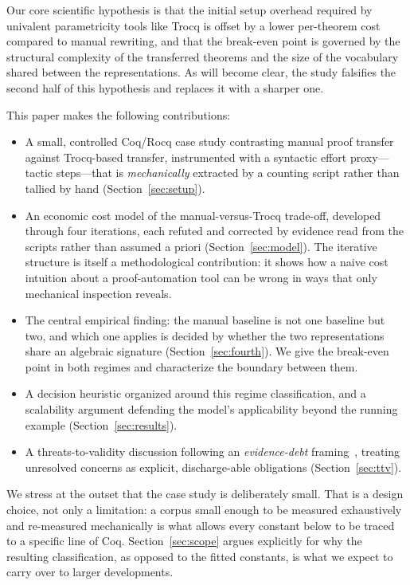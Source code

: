 \documentclass[runningheads]{llncs}
\begin{document}
Our core scientific hypothesis is that the initial setup overhead required by
univalent parametricity tools like Trocq is offset by a lower per-theorem
cost compared to manual rewriting, and that the break-even point is governed
by the structural complexity of the transferred theorems and the size of the
vocabulary shared between the representations. As will become clear, the
study falsifies the second half of this hypothesis and replaces it with a
sharper one.

This paper makes the following contributions:
\begin{itemize}
\item A small, controlled Coq/Rocq case study contrasting manual proof
      transfer against Trocq-based transfer, instrumented with a syntactic
      effort proxy---tactic steps---that is \emph{mechanically} extracted by
      a counting script rather than tallied by hand
      (Section~\ref{sec:setup}).
\item An economic cost model of the manual-versus-Trocq trade-off,
      developed through four iterations, each refuted and corrected by
      evidence read from the scripts rather than assumed a priori
      (Section~\ref{sec:model}). The iterative structure is itself a
      methodological contribution: it shows how a naive cost intuition about
      a proof-automation tool can be wrong in ways that only mechanical
      inspection reveals.
\item The central empirical finding: the manual baseline is not one baseline
      but two, and which one applies is decided by whether the two
      representations share an algebraic signature
      (Section~\ref{sec:fourth}). We give the break-even point in both
      regimes and characterize the boundary between them.
\item A decision heuristic organized around this regime classification, and a
      scalability argument defending the model's applicability beyond the
      running example (Section~\ref{sec:results}).
\item A threats-to-validity discussion following an \emph{evidence-debt}
      framing~\cite{alves2025evidencedebt}, treating unresolved concerns as
      explicit, discharge-able obligations (Section~\ref{sec:ttv}).
\end{itemize}

We stress at the outset that the case study is deliberately small. That is a
design choice, not only a limitation: a corpus small enough to be measured
exhaustively and re-measured mechanically is what allows every constant below
to be traced to a specific line of Coq. Section~\ref{sec:scope} argues
explicitly for why the resulting classification, as opposed to the fitted
constants, is what we expect to carry over to larger developments.
\end{document}
